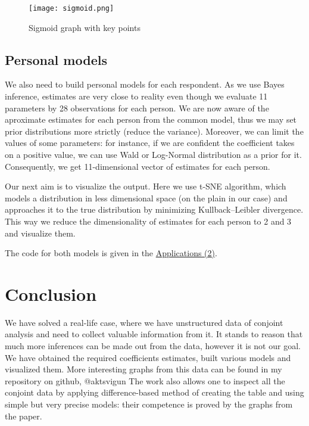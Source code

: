 \documentclass[a4paper, 12pt]{extreport}
\begin{document}
\begin{figure}
  \texttt{[image: sigmoid.png]}
  \caption{Sigmoid graph with key points}
\end{figure}

\subsection{Personal models}
We also need to build personal models for each respondent. As we use Bayes inference, estimates are very close to reality even though we evaluate 11 parameters by 28 observations for each person. We are now aware of
the aproximate estimates for each person from the common model, thus we may set prior distributions more strictly (reduce the variance). Moreover, we can limit the values of some parameters: for instance, if we are
confident the coefficient takes on a positive value, we can use Wald or Log-Normal distribution as a prior for it. Consequently, we get 11-dimensional vector of estimates for each person.

Our next aim is to visualize the output. Here we use t-SNE algorithm, which models a distribution in less dimensional space (on the plain in our case) and approaches it to the true distribution by minimizing
Kullback–Leibler divergence. This way we reduce the dimensionality of estimates for each person to 2 and 3 and visualize them. %

The code for both models is given in the \hyperref[app_2]{Applications (2)}.

\section{Conclusion}
We have solved a real-life case, where we have unstructured data of conjoint analysis and need to collect valuable information from it. It stands to reason that much more inferences can be made out from the data, however
it is not our goal. We have obtained the required coefficients estimates, built various models and visualized them. More interesting graphs from this data can be found in my repository on github, @aktsvigun %
The work also allows one to inspect \cite{Vasylenko92}  all the conjoint data by applying difference-based method of creating the table and using simple but very precise models: their competence is proved by the graphs from the paper.

\end{document}
